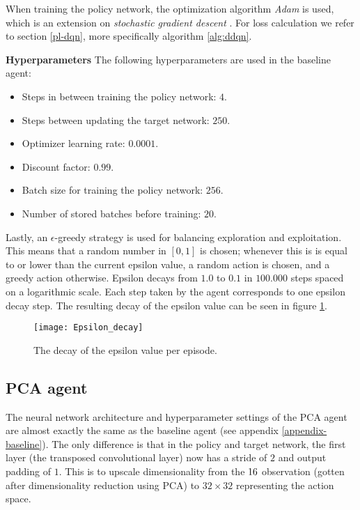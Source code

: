 When training the policy network, the optimization algorithm \emph{Adam} is used, which is an extension on \emph{stochastic gradient descent} \cite{adam}. For loss calculation we refer to section \ref{pl-dqn}, more specifically algorithm \ref{alg:ddqn}.

\noindent\textbf{Hyperparameters}\newline
\noindent The following hyperparameters are used in the baseline agent:
\begin{itemize}
\item Steps in between training the policy network: $4$.
\item Steps between updating the target network: $250$.
\item Optimizer learning rate: $0.0001$.
\item Discount factor: $0.99$.
\item Batch size for training the policy network: $256$.
\item Number of stored batches before training: $20$.
\end{itemize}

Lastly, an $\epsilon$-greedy strategy is used for balancing exploration and exploitation. This means that a random number in $[0,1]$ is chosen; whenever this is is equal to or lower than the current epsilon value, a random action is chosen, and a greedy action otherwise. Epsilon decays from $1.0$ to $0.1$ in $100.000$ steps spaced on a logarithmic scale. Each step taken by the agent corresponds to one epsilon decay step. The resulting decay of the epsilon value can be seen in figure \ref{fig:epsilon}.

\begin{figure}[h]
    \centering
    \texttt{[image: Epsilon\_decay]}
    \caption{The decay of the epsilon value per episode.}
    \label{fig:epsilon}
\end{figure}

\subsection{PCA agent}
The neural network architecture and hyperparameter settings of the PCA agent are almost exactly the same as the baseline agent (see appendix \ref{appendix-baseline}). The only difference is that in the policy and target network, the first layer (the transposed convolutional layer) now has a stride of $2$ and output padding of $1$. This is to upscale dimensionality from the $16 \time 16$ observation (gotten after dimensionality reduction using PCA) to $32 \times 32$ representing the action space.


